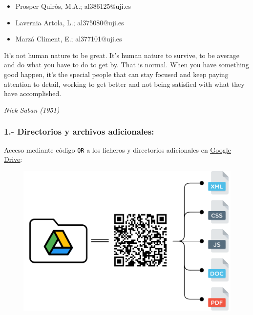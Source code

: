 \documentclass[11pt]{article}
\begin{document}
		
			\begin{itemize}
				\item[] \tabInicial Prosper Quiròs, M.A.; al386125@uji.es
				\item[] \tabInicial Lavernia Artola, L.; al375080@uji.es 
				\item[] \tabInicial Marzá Climent,  E.; al377101@uji.es
			\end{itemize}
		

	\thispagestyle{empty}
	
	\newpage
	\thispagestyle{empty}
	\vspace*{\fill}
	\setlength{\epigraphwidth}{0.65\textwidth}
	\epigraph{It's not human nature to be great. It's human nature to survive, to be average and do what you have to do to get by. That is normal. When you have something good happen, it's the special people that can stay focused and keep paying attention to detail, working to get better and not being satisfied with what they have accomplished.}{\textit{Nick Saban (1951)}}
	\vspace*{\fill}





	\newpage
	\thispagestyle{empty}
	\hrulefill
	\subsubsection*{1.- Directorios y archivos adicionales:}
		Acceso mediante código \texttt{QR} a los ficheros y directorios adicionales en \href{https://drive.google.com/drive/folders/12UCiPFkPC_MBHPvq8_ZDBdCT33m3mgSp?usp=sharing}{\underline{Google Drive}}:

		\begin{figure}[H]
			\begin{center}
			\includegraphics[scale=0.16]{images/googledrive.png}
			\end{center}
		\end{figure}
\end{document}
